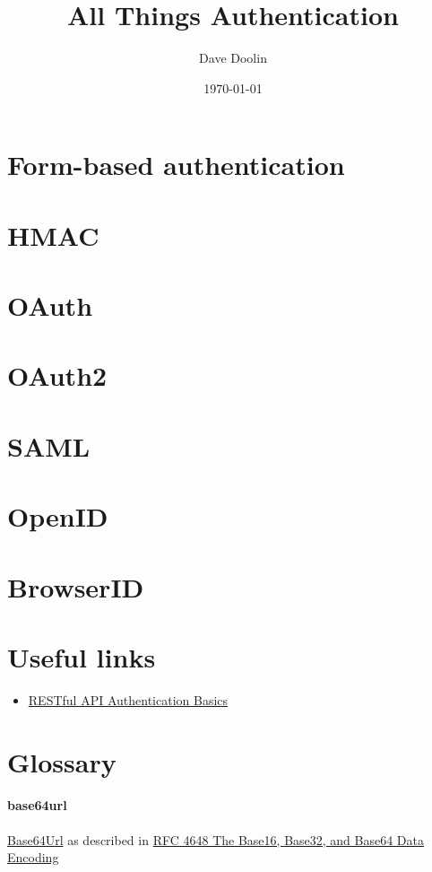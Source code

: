 \documentclass{article}
\title{All Things Authentication}
\date{\today}
\author{Dave Doolin}
\begin{document}
\maketitle

\tableofcontents








\section{Form-based authentication}
\section{HMAC}
\section{OAuth}
\section{OAuth2}
\section{SAML}
\section{OpenID}
\section{BrowserID}

\appendix

\section{Useful links}

\begin{itemize}
  \item \href{https://blog.restcase.com/restful-api-authentication-basics/}{%
      RESTful API Authentication Basics}
\end{itemize}

\section{Glossary}

\paragraph{base64url} \href{https://en.wikipedia.org/wiki/Base64#URL_applications}{%
  Base64Url} as described in \href{https://tools.ietf.org/html/rfc4648}{%
    RFC 4648 The Base16, Base32, and Base64 Data Encoding}
\end{document}
